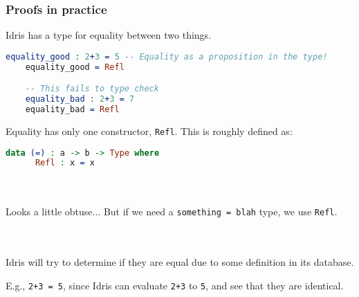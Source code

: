 \documentclass{beamer}
\begin{document}
\begin{frame}[fragile]
  \frametitle{Proofs in practice}

  Idris has a type for equality between two things.

  \pause
  \begin{lstlisting}[language=Idris]
    equality_good : 2+3 = 5 -- Equality as a proposition in the type!
    equality_good = Refl

    -- This fails to type check
    equality_bad : 2+3 = 7
    equality_bad = Refl
  \end{lstlisting}

  \pause
  Equality has only one constructor, \texttt{Refl}. This is roughly defined as:

  \pause
  \begin{lstlisting}[language=Idris]
    data (=) : a -> b -> Type where
      Refl : x = x
  \end{lstlisting}

  \pause \\~\\

  Looks a little obtuse... But if we need a \texttt{something = blah} type, we use \texttt{Refl}.

  \pause \\~\\

  Idris will try to determine if they are equal due to some definition in its database.

  \pause
  E.g., \texttt{2+3 = 5}, since Idris can evaluate \texttt{2+3} to \texttt{5}, and see that they are identical.
\end{frame}
\end{document}
